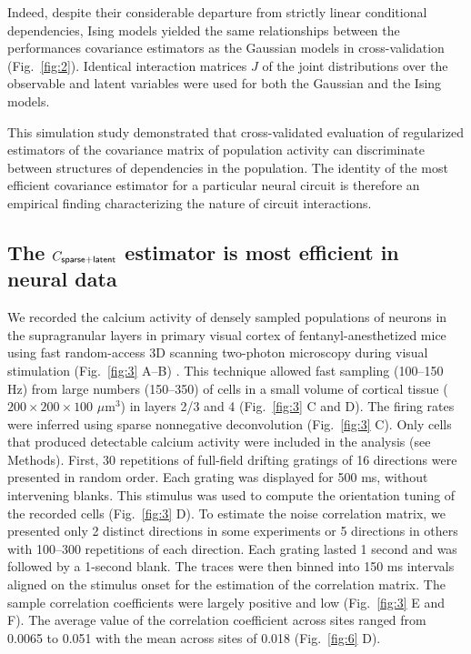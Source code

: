 Indeed, despite their considerable departure from strictly linear conditional dependencies, Ising models yielded the same relationships between the performances covariance estimators as the Gaussian models in cross-validation (Fig.~\ref{fig:2}). Identical interaction matrices $J$  of the joint distributions over the observable and latent variables were used for both the Gaussian and the Ising models.

This simulation study demonstrated that cross-validated evaluation of regularized estimators of the covariance matrix of population activity can discriminate between structures of dependencies in the population. The identity of the most efficient covariance estimator for a particular neural circuit is therefore an empirical finding characterizing the nature of circuit  interactions.

\subsection*{The $C_{\sf sparse+latent}$ estimator is most efficient in neural data}
We recorded the calcium activity of densely sampled populations of neurons in the supragranular layers in primary visual cortex of fentanyl-anesthetized mice using fast random-access 3D scanning two-photon microscopy during visual stimulation (Fig.~\ref{fig:3} A--B) \cite{Reddy:2005, Katona:2012, Cotton:2013}. This technique allowed fast sampling (100--150 Hz) from large numbers (150--350) of cells in a small volume of cortical tissue ($200\times200\times100$ $\mu$m$^3$) in layers 2/3 and 4 (Fig.~\ref{fig:3} C and D).  The firing rates were inferred using sparse nonnegative deconvolution \cite{Vogelstein:2010} (Fig.~\ref{fig:3} C). Only cells that produced detectable calcium activity were included in the analysis (see Methods).  First, 30 repetitions of full-field drifting gratings of 16 directions were presented in random order.  Each grating was displayed for 500 ms, without intervening blanks.  This stimulus was used to compute the orientation tuning of the recorded cells (Fig.~\ref{fig:3} D). To estimate the noise correlation matrix, we presented only 2 distinct directions in some experiments or 5 directions in others with 100--300 repetitions of each direction. Each grating lasted 1 second and was followed by a 1-second blank.  The traces were then binned into 150 ms intervals aligned on the stimulus onset for the estimation of the correlation matrix.   The sample correlation coefficients were largely positive and low (Fig.~\ref{fig:3} E and F). The average value of the correlation coefficient across sites ranged from 0.0065 to 0.051 with the mean across sites of 0.018 (Fig.~\ref{fig:6} D).

